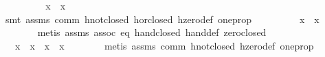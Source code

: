 \begin{isabellebody}
\ \ \ \ \isamarkupfalse%
\ \isamarkupfalse%
\ {}{}{}{}\ {}\ {}{}{}x\ {}\ {}x{}\ {}\ {}\ {}\ {}{}\isanewline
\ \ \ \ \ \ \isamarkupfalse%
\ {}smt\ assms\ comm\ hnot{}closed\ hor{}closed\ hzero{}def\ one{}prop{}\isanewline
\ \ \ \ \isamarkupfalse%
\ \isamarkupfalse%
\ {}{}{}{}\ {}\ {}{}{}x\ {}\ {}x{}\ {}\ {}{}\isanewline
\ \ \ \ \ \ \isamarkupfalse%
\ {}metis\ assms\ assoc\ eq{}\ hand{}closed\ hand{}def\ zero{}closed{}\isanewline
\ \ \ \ \isamarkupfalse%
\ \isamarkupfalse%
\ {}{}{}{}\ {}\ {}{}{}x\ {}\ {}x{}\ {}\ {}{}{}x\ {}\ x{}{}\isanewline
\ \ \ \ \ \ \isamarkupfalse%
\ {}metis\ assms\ comm\ hnot{}closed\ hzero{}def\ one{}prop{}\isanewline

\end{isabellebody}
